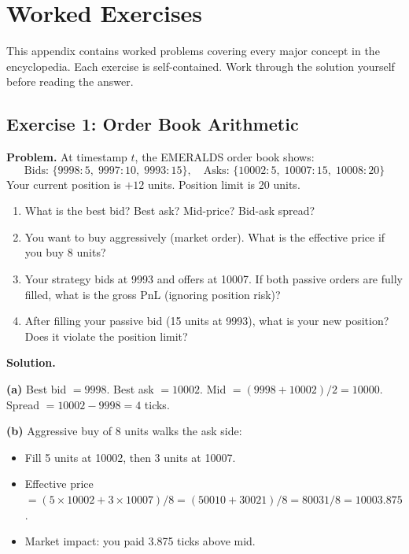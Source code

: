 \documentclass[12pt,a4paper,openany]{report}
\theoremstyle{definition}
\begin{document}

%
%
\appendix

\chapter{Worked Exercises}

This appendix contains worked problems covering every major concept in the encyclopedia. Each exercise is self-contained. Work through the solution yourself before reading the answer.

\section*{Exercise 1: Order Book Arithmetic}

\textbf{Problem.} At timestamp $t$, the EMERALDS order book shows:
\[
  \text{Bids: } \{9998: 5,\; 9997: 10,\; 9993: 15\}, \quad \text{Asks: } \{10002: 5,\; 10007: 15,\; 10008: 20\}
\]
Your current position is $+12$ units. Position limit is 20 units.

\begin{enumerate}[label=(\alph*)]
  \item What is the best bid? Best ask? Mid-price? Bid-ask spread?
  \item You want to buy aggressively (market order). What is the effective price if you buy 8 units?
  \item Your strategy bids at 9993 and offers at 10007. If both passive orders are fully filled, what is the gross PnL (ignoring position risk)?
  \item After filling your passive bid (15 units at 9993), what is your new position? Does it violate the position limit?
\end{enumerate}

\textbf{Solution.}

\textbf{(a)} Best bid $= 9998$. Best ask $= 10002$. Mid $= (9998+10002)/2 = 10000$. Spread $= 10002 - 9998 = 4$ ticks.

\textbf{(b)} Aggressive buy of 8 units walks the ask side:
\begin{itemize}
  \item Fill 5 units at 10002, then 3 units at 10007.
  \item Effective price $= (5 \times 10002 + 3 \times 10007) / 8 = (50010 + 30021)/8 = 80031/8 = 10003.875$.
  \item Market impact: you paid 3.875 ticks above mid.
\end{itemize}
\end{document}
